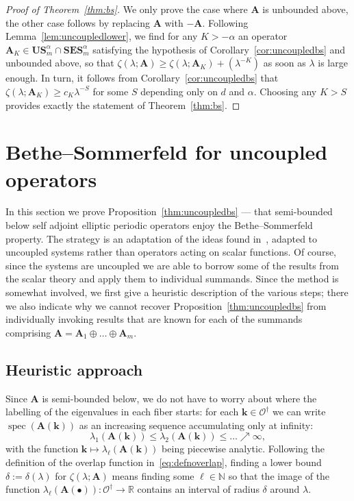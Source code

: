 \documentclass[AHL,Unicode,longabstracts,published]{cedram}
\DeclareMathOperator{\spec}{spec}
\newcommand{\R}{\mathbb R}
\newcommand{\N}{\mathbb N}
\newcommand{\CO}{\mathcal{O}}
\newcommand{\BA}{\mathbf A}
\newcommand{\BE}{\mathbf E}
\newcommand{\BS}{\mathbf S}
\newcommand{\BU}{\mathbf U}
\newcommand{\bk}{\mathbf k}
\begin{document}
\begin{proof}[Proof of Theorem~\ref{thm:bs}]
We only prove the case where $\BA$ is unbounded above, the other case follows by replacing $\BA$ with $-\BA$. Following Lemma~\ref{lem:uncoupledlower}, we find for any $K > - \alpha$ an operator $\BA_K \in \BU\BS^\alpha_m \cap
\BS\BE\BS_m^\alpha$ satisfying the hypothesis of Corollary~\ref{cor:uncoupledbs} and unbounded above, so that $\zeta(\lambda;\BA) \ge
\zeta(\lambda;\BA_K) + (\lambda^{-K})$ as soon as $\lambda$ is large enough. In turn, it follows from Corollary~\ref{cor:uncoupledbs} that $\zeta(\lambda;\BA_K) \ge c_K \lambda^{-S}$ for some $S$ depending only on $d$ and $\alpha$. Choosing any $K > S$ provides exactly the statement of Theorem~\ref{thm:bs}.
\end{proof}



\section{Bethe--Sommerfeld for uncoupled operators} \label{sec:cg}

In this section we prove Proposition~\ref{thm:uncoupledbs} --- that semi-bounded below self adjoint elliptic periodic operators enjoy the Bethe--Sommerfeld property. The strategy is an adaptation of the ideas found in~\cite{barbpar,parnovski,ParSob2010}, adapted to uncoupled systems rather than operators acting on scalar functions. Of course, since the systems are uncoupled we are able to borrow some of the results from the scalar theory and apply them to individual summands. Since the method is somewhat involved, we first give a heuristic description of the various steps; there we also indicate why we cannot recover Proposition~\ref{thm:uncoupledbs} from individually invoking results that are known for each of the summands comprising $\BA = \BA_1
\oplus \dotso \oplus \BA_m$.

\subsection{Heuristic approach}

Since $\BA$ is semi-bounded below, we do not have to worry about where the labelling of the eigenvalues in each fiber starts: for each $\bk \in \CO^\dagger$ we can write $\spec(\BA(\bk))$ as an increasing sequence accumulating only at infinity:
\begin{equation}
\lambda_1(\BA(\bk)) \le \lambda_2(\BA(\bk)) \le \dotso \nearrow \infty,
\end{equation}
with the function $\bk \mapsto \lambda_\ell(\BA(\bk))$ being piecewise analytic. Following the definition of the overlap function in~\eqref{eq:defnoverlap}, finding a lower bound $\delta := \delta(\lambda)$ for $\zeta(\lambda;\BA)$ means finding some $\ell \in \N$ so that the image of the function $\lambda_\ell(\BA(\bullet)) : \CO^\dagger \to \R$ contains an interval of radius $\delta$ around $\lambda$.
\end{document}
